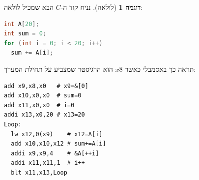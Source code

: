 \documentclass[12pt]{article}
\theoremstyle{plain}
\theoremstyle{definition}
\newtheorem{example}[theorem]{דוגמה}      %
\theoremstyle{remark}
\begin{document}
\begin{example}[לולאה]
נניח קוד ה-\({C}\) הבא שמכיל לולאה:\begin{LTR}\begin{lstlisting}[language=c]
int A[20];
int sum = 0;
for (int i = 0; i < 20; i++)
  sum += A[i];

\end{lstlisting}\end{LTR}תראה כך באסמבלי כאשר \({x8}\) הוא הרגיסטר שמצביע על תחילת המערך:\begin{LTR}\begin{lstlisting}[language=assembly]
add x9,x8,x0   # x9=&[0]
add x10,x0,x0  # sum=0
add x11,x0,x0  # i=0
addi x13,x0,20 # x13=20
Loop:
  lw x12,0(x9)    # x12=A[i]
  add x10,x10,x12 # sum+=A[i]
  addi x9,x9,4    # &A[++i]
  addi x11,x11,1  # i++
  blt x11,x13,Loop

\end{lstlisting}\end{LTR}
\end{example}
\end{document}
